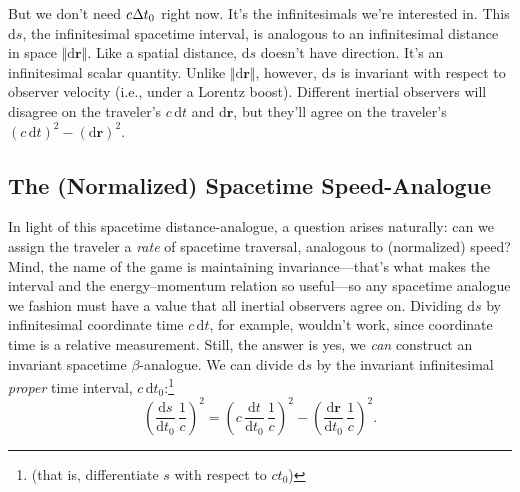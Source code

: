 \documentclass[12pt]{article}
\renewcommand{\vv}[1]{\mathbf{#1}}
\newcommand{\dd}[1]{\mathrm{d}#1}
\begin{document}
But we don't need $c \mkern.5mu \Delta t_0$ right now. It's the infinitesimals we're interested in. This $\dd s$, the infinitesimal spacetime interval, is analogous to an infinitesimal distance in space $\Vert \dd \vv r \Vert$. Like a spatial distance, $\dd s$ doesn't have direction. It's an infinitesimal scalar quantity. Unlike $\Vert \dd \vv r \Vert$, however, $\dd s$ is invariant with respect to observer velocity (i.e., under a Lorentz boost). Different inertial observers will disagree on the traveler's $c \, \dd t$ and $\dd \vv r$, but they'll agree on the traveler's $(c \, \dd t)^2 - (\dd \vv r)^2$.

\subsection{The (Normalized) Spacetime Speed-Analogue}\label{ssec:b}

In light of this spacetime distance-analogue, a question arises naturally: can we assign the traveler a \emph{rate} of spacetime traversal, analogous to (normalized) speed? Mind, the name of the game is maintaining invariance---that's what makes the interval and the energy--momentum relation so useful---so any spacetime analogue we fashion must have a value that all inertial observers agree on. Dividing $\dd s$ by infinitesimal coordinate time $c \, \dd t$, for example, wouldn't work, since coordinate time is a relative measurement. Still, the answer is yes, we \emph{can} construct an invariant spacetime $\beta$-analogue. We can divide $\dd s$ by the invariant infinitesimal \emph{proper} time interval, $c \, \dd t_0$:\footnote{(that is, differentiate $s$ with respect to $ct_0$)}
\begin{equation*}
\left(\dfrac{\dd s}{\dd t_0} \, \dfrac{1}{c}\right)^2 = \left(c \, \dfrac{\dd t}{\dd t_0} \, \dfrac{1}{c}\right)^2 - \left(\dfrac{\dd \vv r}{\dd t_0} \, \dfrac{1}{c}\right)^2.
\end{equation*}
\end{document}
